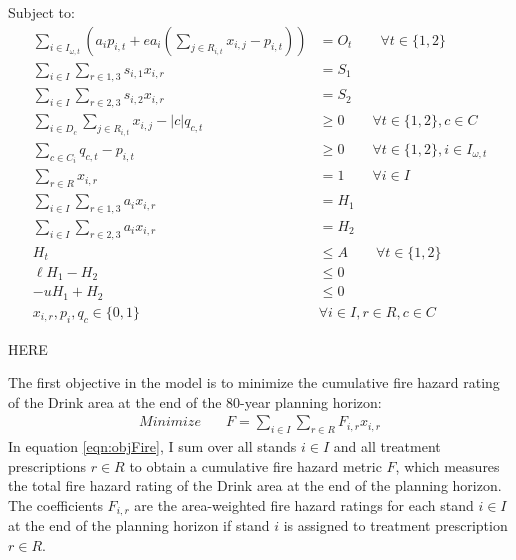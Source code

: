 Subject to:
\begin{align}
\sum_{i\in I_{\omega,t}} \left(a_i p_{i,t} + e a_i \left( \sum_{j \in R_{i,t}} x_{i,j}-p_{i,t} \right) \right) &= O_t \qquad \forall t \in \{1,2\} \label{eqn:constraintDefOwl}\\
\sum_{i\in I} \sum_{r\in 1,3} s_{i,1} x_{i,r} &= S_1 \label{eqn:constraintSediment1} \\
\sum_{i\in I} \sum_{r\in 2,3} s_{i,2} x_{i,r} &= S_2 \label{eqn:constraintSediment2} \\
\sum_{i \in D_c} \sum_{j \in R_{i,t}} x_{i,j} - |c| q_{c,t} &\ge 0 \qquad \forall t \in \{1,2\}, c \in C \label{eqn:constraintClusterTriggers} \\
\sum_{c \in C_i} q_{c,t} - p_{i,t} &\ge 0 \qquad \forall t \in \{1,2\}, i \in I_{\omega,t} \label{eqn:constraintPVarTriggers} \\
\sum_{r \in R} x_{i,r} &= 1  \qquad \forall i \in I \label{eqn:constraintOnePrescrip} \\
\sum_{i \in I} \sum_{r \in 1,3} a_i x_{i,r} &= H_1 \label{eqn:constraintAreaAcctg1} \\
\sum_{i \in I} \sum_{r \in 2,3} a_i x_{i,r} &= H_2 \label{eqn:constraintAreaAcctg2} \\
H_t &\le A \qquad \forall t \in \{1,2\} \label{eqn:constraintAreaRestr} \\
\ell H_1 - H_2 &\le 0 \label{eqn:constraintAreaFlucL} \\
-u H_1 + H_2 &\le 0 \label{eqn:constraintAreaFlucU} \\
x_{i,r}, p_i, q_c \in \{0,1\} \quad &\forall i \in I, r \in R, c \in C \label{eqn:constraintNonNeg}
\end{align}

HERE

The first objective in the model is to minimize the cumulative fire hazard rating of the Drink area at the end of the 80-year planning horizon:
\begin{align}
Minimize \quad & F = \sum_{i\in I} \sum_{r\in R} F_{i,r} x_{i,r}
\end{align}
In equation \eqref{eqn:objFire}, I sum over all stands $i \in I$ and all treatment prescriptions $r \in R$ to obtain a cumulative fire hazard metric $F$, which measures the total fire hazard rating of the Drink area at the end of the planning horizon. The coefficients $F_{i,r}$ are the area-weighted fire hazard ratings for each stand $i \in I$ at the end of the planning horizon if stand $i$ is assigned to treatment prescription $r \in R$.

